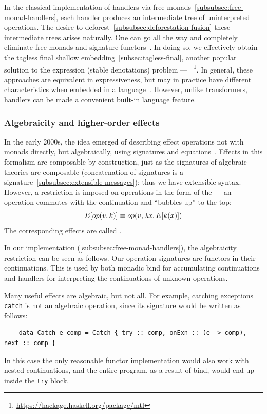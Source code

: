 In the classical implementation of handlers via free monads~\ref{subsubsec:free-monad-handlers}, each handler produces an intermediate tree of uninterpreted operations.
The desire to deforest~\ref{subsubsec:deforestation-fusion} these intermediate trees arises naturally.
One can go all the way and completely eliminate free monads and signature functors~\cite{wu2015fusion}.
In doing so, we effectively obtain the tagless final shallow embedding~\ref{subsec:tagless-final}, another popular solution to the expression (stable denotations) problem --- ~\cite{liang1995monad,jones1995functional}\footnote{\url{https://hackage.haskell.org/package/mtl}}.
In general, these approaches are equivalent in expressiveness, but may in practice have different characteristics when embedded in a language~\cite{schrijvers2019monad}.
However, unlike transformers, handlers can be made a convenient built-in language feature.


\subsubsection{Algebraicity and higher-order effects} \label{subsubsec:algebraicity-higher-order}

In the early 2000s, the idea emerged of describing effect operations not with monads directly, but algebraically, using signatures and equations~\cite{plotkin2002notions, bauer2018algebraic}.
Effects in this formalism are composable by construction, just as the signatures of algebraic theories are composable (concatenation of signatures is a signature~\ref{subsubsec:extensible-messages}); thus we have extensible syntax.
However, a restriction is imposed on operations in the form of the  --- an operation commutes with the continuation and ``bubbles up'' to the top:
\[
    E[op(v, k)] \equiv op(v, \lambda x\ldotp E[k(x)])
\]
The corresponding effects are called .

In our implementation (\ref{subsubsec:free-monad-handlers}), the algebraicity restriction can be seen as follows.
Our operation signatures are functors in their continuations.
This is used by both monadic bind for accumulating continuations and handlers for interpreting the continuations of unknown operations.

Many useful effects are algebraic, but not all.
For example, catching exceptions \texttt{catch} is not an algebraic operation, since its signature would be written as follows:
\begin{verbatim}
    data Catch e comp = Catch { try :: comp, onExn :: (e -> comp), next :: comp }
\end{verbatim}
In this case the only reasonable functor implementation would also work with nested continuations, and the entire program, as a result of bind, would end up inside the \texttt{try} block.

